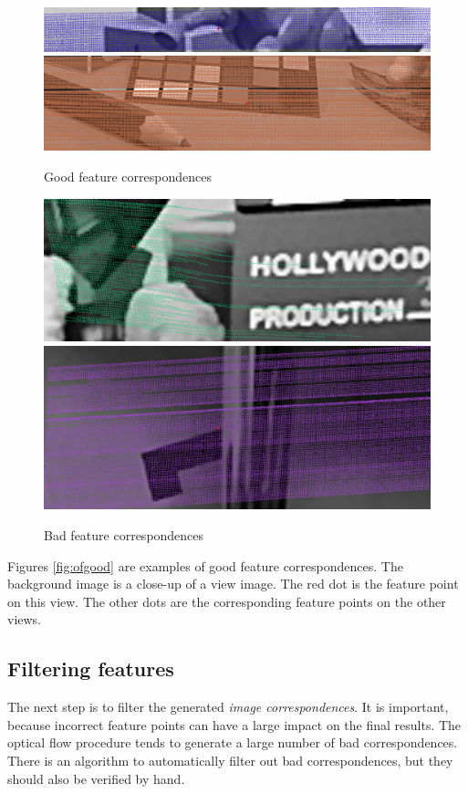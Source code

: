 \documentclass[11pt]{scrreprt}
\begin{document}
\begin{figure}
\includegraphics[width=\textwidth]{ofgood1.png}
\includegraphics[width=\textwidth]{ofgood2.png}
\caption{Good feature correspondences}
\label{fig:ofgood}

\vspace{1.5cm}

\includegraphics[width=\textwidth]{ofbad2.png}
\includegraphics[width=\textwidth]{ofbad1.png}
\caption{Bad feature correspondences}
\label{fig:ofbad}
\end{figure}

Figures \ref{fig:ofgood} are examples of good feature correspondences. The background image is a close-up of a view image. The red dot is the feature point on this view. The other dots are the corresponding feature points on the other views. 

\subsection{Filtering features}
The next step is to filter the generated \emph{image correspondences}. It is important, because incorrect feature points can have a large impact on the final results. The optical flow procedure tends to generate a large number of bad correspondences. There is an algorithm to automatically filter out bad correspondences, but they should also be verified by hand.
\end{document}

